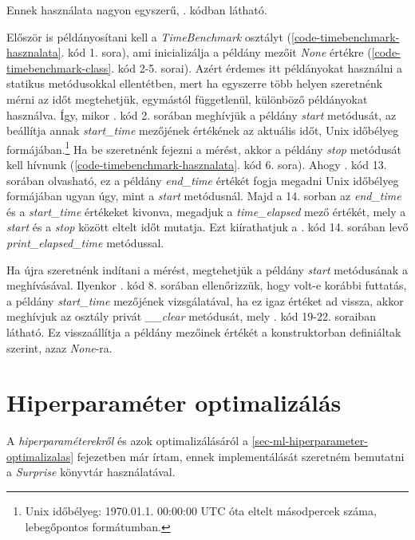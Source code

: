 \documentclass[
]{thesis-ekf}
\theoremstyle{definition}
\theoremstyle{remark}
\begin{document}


Ennek használata nagyon egyszerű, . kódban látható.



Először is példányosítani kell a \emph{TimeBenchmark} osztályt (\ref{code-timebenchmark-hasznalata}. kód 1. sora), ami inicializálja a példány mezőit \emph{None} értékre (\ref{code-timebenchmark-class}. kód 2-5. sorai). Azért érdemes itt példányokat használni a statikus metódusokkal ellentétben, mert ha egyszerre több helyen szeretnénk mérni az időt megtehetjük, egymástól függetlenül, különböző példányokat használva. Így, mikor . kód 2. sorában meghívjük a példány \emph{start} metódusát, az beállítja annak \emph{start\_time} mezőjének értékének az aktuális időt, Unix időbélyeg formájában.\footnote{Unix időbélyeg: 1970.01.1. 00:00:00 UTC óta eltelt másodpercek száma, lebegőpontos formátumban.} Ha be szeretnénk fejezni a mérést, akkor a példány \emph{stop} metódusát kell hívnunk (\ref{code-timebenchmark-hasznalata}. kód 6. sora). Ahogy . kód 13. sorában olvasható, ez a példány \emph{end\_time} értékét fogja megadni Unix időbélyeg formájában ugyan úgy, mint a \emph{start} metódusnál. Majd a 14. sorban az \emph{end\_time} és a \emph{start\_time} értékeket kivonva, megadjuk a \emph{time\_elapsed} mező értékét, mely a \emph{start} és a \emph{stop} között eltelt időt mutatja. Ezt kiírathatjuk a . kód 14. sorában levő \emph{print\_elapsed\_time} metódussal.

Ha újra szeretnénk indítani a mérést, megtehetjük a példány \emph{start} metódusának a meghívásával. Ilyenkor . kód 8. sorában ellenőrizzük, hogy volt-e korábbi futtatás, a példány \emph{start\_time} mezőjének vizsgálatával, ha ez igaz értéket ad vissza, akkor meghívjuk az osztály privát \emph{\_\_clear} metódusát, mely . kód 19-22. soraiban látható. Ez visszaállítja a példány mezőinek értékét a konstruktorban definiáltak szerint, azaz \emph{None}-ra.

\section{Hiperparaméter optimalizálás}
\label{sec-hiperparameter-optimalizalas}
A \emph{hiperparaméterekről} és azok optimalizálásáról a \ref{sec-ml-hiperparameter-optimalizalas} fejezetben már írtam, ennek implementálását szeretném bemutatni a \emph{Surprise} könyvtár használatával.
\end{document}
